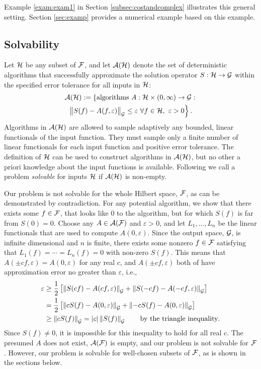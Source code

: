 \documentclass[graybox,footinfo]{svmult}
\newcommand{\DHJRnorm}[2][{}]{\ensuremath{\left \lVert #2 \right \rVert}_{#1}}
\newcommand{\DHJRbignorm}[2][{}]{\ensuremath{\bigl \lVert #2 \bigr \rVert}_{#1}}
\newcommand{\DHJRabs}[1]{\ensuremath{{\left \lvert #1 \right \rvert}}}
\begin{document}
Example \ref{exam:exam1} in Section \ref{subsec:costandcomplex} illustrates this general setting.  Section \ref{sec:examp} provides a numerical example based on this example.

\subsection{Solvability}  Let ${\mathcal{H}}$ be any subset of ${\mathcal{F}}$, and let ${\mathcal{A}}({\mathcal{H}})$ denote the set of deterministic algorithms that successfully approximate the solution operator $S : {\mathcal{H}} \to {\mathcal{G}}$ within the specified error tolerance for all inputs in ${\mathcal{H}}$:
\begin{multline} \label{adapErrCrit}
\calA(\calH) : = \left\{ \text{algorithms } A:\calH \times (0,\infty) \rightarrow \calG : 
\right . \\ \left .
\DHJRbignorm[\calG]{S(f) - A(f,\varepsilon)} \le \varepsilon \ \forall f \in \calH, \ \varepsilon > 0 
\right \}.
\end{multline}
Algorithms in ${\mathcal{A}}({\mathcal{H}})$ are allowed to sample adaptively any bounded, linear functionals
of the input function.  They must sample only a finite number of linear functionals for each input function and positive error tolerance.  The definition of ${\mathcal{H}}$ can be used to construct algorithms in ${\mathcal{A}}({\mathcal{H}})$, but no other a priori knowledge about the input functions is available.  Following \cite{KunEtal19a} we call a problem \emph{solvable} for inputs ${\mathcal{H}}$ if ${\mathcal{A}}({\mathcal{H}})$ is non-empty.

Our problem is not solvable for the whole Hilbert space, ${\mathcal{F}}$, as can be demonstrated by contradiction. For any potential algorithm, we show that there exists some $f \in {\mathcal{F}}$, that looks like $0$ to the algorithm, but for which $S(f)$ is far from $S(0) = 0$.   Choose any $A \in {\mathcal{A}}({\mathcal{F}})$ and $\varepsilon > 0$, and let $L_1, \ldots, L_n$ be the linear functionals that are used to compute $A(0,\varepsilon)$. Since the output space, ${\mathcal{G}}$, is infinite dimensional and $n$ is finite, there exists some nonzero $f \in {\mathcal{F}}$ satisfying that $L_1(f) = \cdots = L_n(f) = 0$ with non-zero $S(f)$. This means that $A(\pm cf,\varepsilon) = A(0,\varepsilon)$ for any real $c$, and $A(\pm cf,\varepsilon)$ both of have approximation error no greater than $\varepsilon$, i.e.,
\begin{align*}
    \varepsilon &\ge \frac 12 \left[ \DHJRnorm[\calG]{S(cf) - A(cf,\varepsilon)} + \DHJRnorm[\calG]{S(-cf) - A(-cf,\varepsilon)}\right] \\
    & =  \frac 12 \left[ \DHJRnorm[\calG]{cS(f) - A(0,\varepsilon)} + \DHJRnorm[\calG]{-cS(f) - A(0,\varepsilon)}\right] \\
    & \ge  \DHJRnorm[\calG]{cS(f)} = \DHJRabs{c}\DHJRnorm[\calG]{S(f)}  \qquad \text{by the triangle inequality}.
\end{align*}
Since $S(f) \ne 0$, it is impossible for this inequality to hold for all real $c$.  The presumed $A$ does not exist, ${\mathcal{A}}({\mathcal{F}})$ is empty, and our problem is not solvable for ${\mathcal{F}}$. However, our problem is solvable for well-chosen subsets of ${\mathcal{F}}$, as is shown in the sections below.
\end{document}
